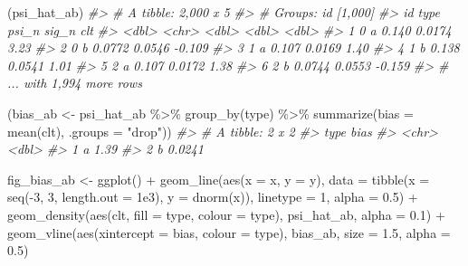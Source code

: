 \documentclass[
  11pt,
  openright,twoside]{book}
\newenvironment{Shaded}{\begin{snugshade}}{\end{snugshade}}
\newcommand{\AttributeTok}[1]{\textcolor[rgb]{0.77,0.63,0.00}{#1}}
\newcommand{\CommentTok}[1]{\textcolor[rgb]{0.56,0.35,0.01}{\textit{#1}}}
\newcommand{\DecValTok}[1]{\textcolor[rgb]{0.00,0.00,0.81}{#1}}
\newcommand{\FloatTok}[1]{\textcolor[rgb]{0.00,0.00,0.81}{#1}}
\newcommand{\FunctionTok}[1]{\textcolor[rgb]{0.00,0.00,0.00}{#1}}
\newcommand{\NormalTok}[1]{#1}
\newcommand{\OtherTok}[1]{\textcolor[rgb]{0.56,0.35,0.01}{#1}}
\newcommand{\SpecialCharTok}[1]{\textcolor[rgb]{0.00,0.00,0.00}{#1}}
\newcommand{\StringTok}[1]{\textcolor[rgb]{0.31,0.60,0.02}{#1}}
\theoremstyle{definition}
\theoremstyle{definition}
\theoremstyle{definition}
\theoremstyle{definition}
\theoremstyle{remark}
\begin{document}
\begin{Shaded}
\begin{Highlighting}[]
\NormalTok{(psi\_hat\_ab)}
\CommentTok{\#\textgreater{} \# A tibble: 2,000 x 5}
\CommentTok{\#\textgreater{} \# Groups:   id [1,000]}
\CommentTok{\#\textgreater{}      id type   psi\_n  sig\_n    clt}
\CommentTok{\#\textgreater{}   \textless{}dbl\textgreater{} \textless{}chr\textgreater{}  \textless{}dbl\textgreater{}  \textless{}dbl\textgreater{}  \textless{}dbl\textgreater{}}
\CommentTok{\#\textgreater{} 1     0 a     0.140  0.0174  3.23 }
\CommentTok{\#\textgreater{} 2     0 b     0.0772 0.0546 {-}0.109}
\CommentTok{\#\textgreater{} 3     1 a     0.107  0.0169  1.40 }
\CommentTok{\#\textgreater{} 4     1 b     0.138  0.0541  1.01 }
\CommentTok{\#\textgreater{} 5     2 a     0.107  0.0172  1.38 }
\CommentTok{\#\textgreater{} 6     2 b     0.0744 0.0553 {-}0.159}
\CommentTok{\#\textgreater{} \# ... with 1,994 more rows}

\NormalTok{(bias\_ab }\OtherTok{\textless{}{-}}\NormalTok{ psi\_hat\_ab }\SpecialCharTok{\%\textgreater{}\%}
   \FunctionTok{group\_by}\NormalTok{(type) }\SpecialCharTok{\%\textgreater{}\%} \FunctionTok{summarize}\NormalTok{(}\AttributeTok{bias =} \FunctionTok{mean}\NormalTok{(clt), }\AttributeTok{.groups =} \StringTok{"drop"}\NormalTok{))}
\CommentTok{\#\textgreater{} \# A tibble: 2 x 2}
\CommentTok{\#\textgreater{}   type    bias}
\CommentTok{\#\textgreater{}   \textless{}chr\textgreater{}  \textless{}dbl\textgreater{}}
\CommentTok{\#\textgreater{} 1 a     1.39  }
\CommentTok{\#\textgreater{} 2 b     0.0241}

\NormalTok{fig\_bias\_ab }\OtherTok{\textless{}{-}} \FunctionTok{ggplot}\NormalTok{() }\SpecialCharTok{+}
  \FunctionTok{geom\_line}\NormalTok{(}\FunctionTok{aes}\NormalTok{(}\AttributeTok{x =}\NormalTok{ x, }\AttributeTok{y =}\NormalTok{ y), }
            \AttributeTok{data =} \FunctionTok{tibble}\NormalTok{(}\AttributeTok{x =} \FunctionTok{seq}\NormalTok{(}\SpecialCharTok{{-}}\DecValTok{3}\NormalTok{, }\DecValTok{3}\NormalTok{, }\AttributeTok{length.out =} \FloatTok{1e3}\NormalTok{),}
                          \AttributeTok{y =} \FunctionTok{dnorm}\NormalTok{(x)),}
            \AttributeTok{linetype =} \DecValTok{1}\NormalTok{, }\AttributeTok{alpha =} \FloatTok{0.5}\NormalTok{) }\SpecialCharTok{+}
  \FunctionTok{geom\_density}\NormalTok{(}\FunctionTok{aes}\NormalTok{(clt, }\AttributeTok{fill =}\NormalTok{ type, }\AttributeTok{colour =}\NormalTok{ type),}
\NormalTok{               psi\_hat\_ab, }\AttributeTok{alpha =} \FloatTok{0.1}\NormalTok{) }\SpecialCharTok{+}
  \FunctionTok{geom\_vline}\NormalTok{(}\FunctionTok{aes}\NormalTok{(}\AttributeTok{xintercept =}\NormalTok{ bias, }\AttributeTok{colour =}\NormalTok{ type),}
\NormalTok{             bias\_ab, }\AttributeTok{size =} \FloatTok{1.5}\NormalTok{, }\AttributeTok{alpha =} \FloatTok{0.5}\NormalTok{)}
  

\end{Highlighting}
\end{Shaded}
\end{document}
